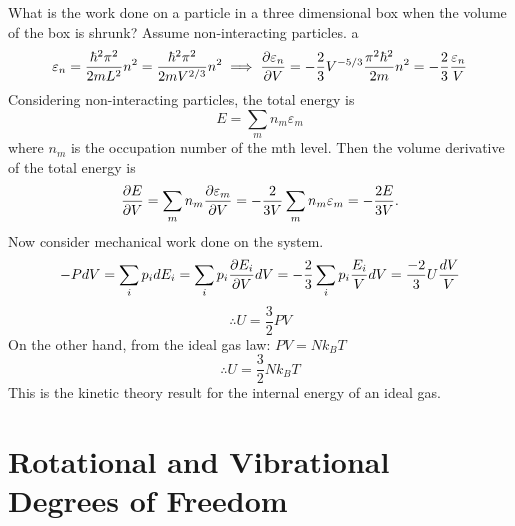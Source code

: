     \begin{problem}{What is the work done on a particle in a three dimensional box when the volume of the box is shrunk? Assume non-interacting particles. }
     a
        \begin{equation}
            \varepsilon_n = \frac{\hbar^2\pi^2}{2mL^2}n^2 = \frac{\hbar^2\pi^2}{2mV^{2/3}}n^2 \implies \frac{\partial \varepsilon_n}{\partial V} = -\frac{2}{3}V^{-5/3}\frac{\pi^2\hbar^2}{2m}n^2 = -\frac{2}{3}\frac{\varepsilon_n}{V}
        \end{equation}
        Considering non-interacting particles, the total energy is 
        \begin{equation}
            E = \sum_mn_m\varepsilon_m
        \end{equation}
        where $n_m$ is the occupation number of the mth level. Then the volume derivative of the total energy is
        \begin{equation}
            \frac{\partial E}{\partial V} = \sum_mn_m\frac{\partial \varepsilon_m}{\partial V} = -\frac{2}{3V}\sum_mn_m\varepsilon_m = -\frac{2E}{3V}.
        \end{equation}
        Now consider mechanical work done on the system.
        \begin{equation}
            -PdV = \sum_ip_idE_i = \sum_ip_i\frac{\partial E_i}{\partial V}dV = -\frac{2}{3}\sum_ip_i\frac{E_i}{V}dV = \frac{-2}{3}U\frac{dV}{V}
        \end{equation}
        \begin{equation}
            \therefore U = \frac{3}{2}PV
        \end{equation}
        On the other hand, from the ideal gas law: $PV=Nk_BT$
        \begin{equation}
            \therefore U = \frac{3}{2}Nk_BT
        \end{equation}
        This is the kinetic theory result for the internal energy of an ideal gas. 
    \end{problem}
\section{Rotational and Vibrational \\ Degrees of Freedom}
    
